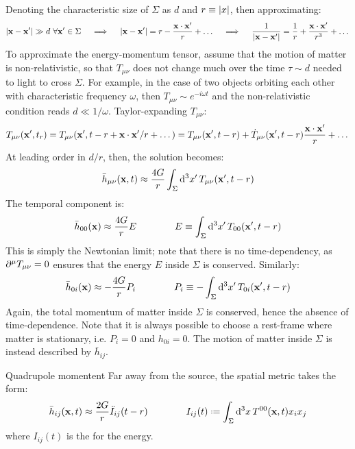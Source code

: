 Denoting the characteristic size of $ \Sigma $ as $ d $ and $ r \equiv \left\lvert x\right\rvert $, then approximating:
\begin{equation*}
  \left\lvert\mathbf{x} - \mathbf{x}'\right\rvert \gg d \,\,\forall \mathbf{x}' \in \Sigma
  \quad \implies \quad
  \left\lvert\mathbf{x} - \mathbf{x}'\right\rvert = r - \frac{\mathbf{x} \cdot \mathbf{x}'}{r} + \dots
  \quad \implies \quad
  \frac{1}{\left\lvert\mathbf{x} - \mathbf{x}'\right\rvert} = \frac{1}{r} + \frac{\mathbf{x} \cdot \mathbf{x}'}{r^3} + \dots
\end{equation*}
To approximate the energy-momentum tensor, assume that the motion of matter is non-relativistic, so that $ T_{\mu \nu} $ does not change much over the time $ \tau \sim d $ needed to light to cross $ \Sigma $. For example, in the case of two objects orbiting each other with characteristic frequency $ \omega $, then $ T_{\mu \nu} \sim e^{-i \omega t} $ and the non-relativistic condition reads $ d \ll 1/\omega $. Taylor-expanding $ T_{\mu \nu} $:
\begin{equation*}
  T_{\mu \nu}(\mathbf{x}',t_r) = T_{\mu \nu} (\mathbf{x}', t - r + \mathbf{x} \cdot \mathbf{x}' / r + \dots) = T_{\mu \nu}(\mathbf{x}', t - r) + \dot{T}_{\mu \nu} (\mathbf{x}', t - r) \frac{\mathbf{x} \cdot \mathbf{x}'}{r} + \dots
\end{equation*}
At leading order in $ d/r $, then, the solution becomes:
\begin{equation*}
  \bar{h}_{\mu \nu} (\mathbf{x},t) \approx \frac{4G}{r} \int_\Sigma \mathrm{d}^3 x'\, T_{\mu \nu}(\mathbf{x}', t - r)
\end{equation*}
The temporal component is:
\begin{equation*}
  \bar{h}_{00}(\mathbf{x}) \approx \frac{4G}{r} E
  \qquad \qquad
  E \equiv \int_\Sigma \mathrm{d}^3 x'\, T_{00}(\mathbf{x}', t - r)
\end{equation*}
This is simply the Newtonian limit; note that there is no time-dependency, as $ \partial^\mu T_{\mu \nu} = 0 $ ensures that the energy $ E $ inside $ \Sigma $ is conserved. Similarly:
\begin{equation*}
  \bar{h}_{0 i}(\mathbf{x}) \approx - \frac{4G}{r} P_i
  \qquad \qquad
  P_i \equiv - \int_\Sigma \mathrm{d}^3 x'\, T_{0 i}(\mathbf{x}', t - r)
\end{equation*}
Again, the total momentum of matter inside $ \Sigma $ is conserved, hence the absence of time-dependence. Note that it is always possible to choose a rest-frame where matter is stationary, i.e. $ P_i = 0 $ and $ h_{0 i} = 0 $. The motion of matter inside $ \Sigma $ is instead described by $ \bar{h}_{ij} $.

\begin{proposition}{Quadrupole momentent}{}
  Far away from the source, the spatial metric takes the form:
  \begin{equation}
    \bar{h}_{ij}(\ve{x},t) \approx \frac{2G}{r} \ddot{I}_{ij}(t - r)
    \qquad \qquad
    I_{ij}(t) \defeq \int_\Sigma \dd^3 x\, T^{00}(\ve{x},t) x_i x_j
    \label{eq:quarupole-moment}
  \end{equation}
  where $ I_{ij}(t) $ is the  for the energy.
\end{proposition}

